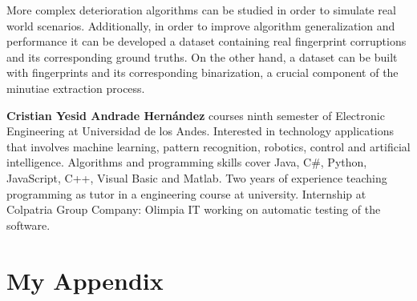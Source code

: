 \documentclass[a4paper,fleqn]{cas-dc}
\begin{document}
More complex deterioration algorithms can be studied in order to simulate real world scenarios. Additionally, in order to improve algorithm generalization and performance it can be developed a dataset containing real fingerprint corruptions and its corresponding ground truths. On the other hand, a dataset can be built with fingerprints and its corresponding binarization, a crucial component of the minutiae extraction process.

\printcredits

%





\textbf{Cristian Yesid Andrade Hernández} courses ninth semester of Electronic Engineering at Universidad de los Andes. Interested in technology applications that involves machine learning, pattern recognition, robotics, control and artificial intelligence. Algorithms and programming skills cover Java, C\#, Python, JavaScript, C++, Visual Basic and Matlab. Two years of experience teaching programming as tutor in a engineering course at university. Internship at Colpatria Group Company: Olimpia IT working on automatic testing of the software.
\endbio

\onecolumn
\appendix
\section{My Appendix}
\end{document}
